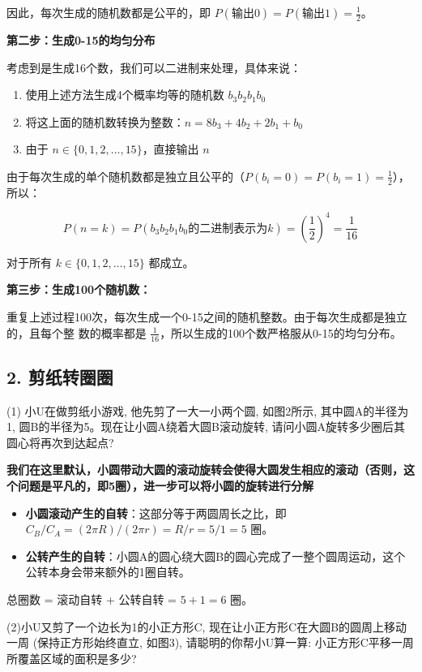 \documentclass[UTF8]{ctexart}
\begin{document}
因此，每次生成的随机数都是公平的，即 $P(\text{输出0}) = P(\text{输出1}) =
\frac{1}{2}$。

\textbf{第二步：生成0-15的均匀分布}

考虑到是生成16个数，我们可以二进制来处理，具体来说：
\begin{enumerate}
    \item 使用上述方法生成4个概率均等的随机数 $b_3b_2b_1b_0$
    \item 将这上面的随机数转换为整数：$n = 8b_3 + 4b_2 + 2b_1 + b_0$
    \item 由于 $n \in \{0,1,2,\ldots,15\}$，直接输出 $n$
\end{enumerate}


由于每次生成的单个随机数都是独立且公平的（$P(b_i = 0) = P(b_i = 1) = \frac{1}{2}$），所以：

$$P(n = k) = P(b_3b_2b_1b_0 \text{的二进制表示为} k) = \left(\frac{1}{2}\right)^4 =
\frac{1}{16}$$

对于所有 $k \in \{0,1,2,\ldots,15\}$ 都成立。

\textbf{第三步：生成100个随机数：}

重复上述过程100次，每次生成一个0-15之间的随机整数。由于每次生成都是独立的，且每个整
数的概率都是 $\frac{1}{16}$，所以生成的100个数严格服从0-15的均匀分布。

\subsection*{2. 剪纸转圈圈}

(1) 小U在做剪纸小游戏, 他先剪了一大一小两个圆, 如图2所示, 其中圆A的半径为1, 圆B的半径为5。现在让小圆A绕着大圆B滚动旋转, 请问小圆A旋转多少圈后其圆心将再次到达起点?

\textbf{我们在这里默认，小圆带动大圆的滚动旋转会使得大圆发生相应的滚动（否则，这个问题是平凡的，即5圈），进一步可以将小圆的旋转进行分解}
\begin{itemize}
    \item \textbf{小圆滚动产生的自转}：这部分等于两圆周长之比，即 $C_B / C_A = (2\pi R)/(2\pi r) = R/r = 5/1 = 5$ 圈。 
    \item \textbf{公转产生的自转}：小圆A的圆心绕大圆B的圆心完成了一整个圆周运动，这个公转本身会带来额外的1圈自转。
\end{itemize}
总圈数 = 滚动自转 + 公转自转 = $5 + 1 = 6$ 圈。

(2)小U又剪了一个边长为1的小正方形C, 现在让小正方形C在大圆B的圆周上移动一周 (保持正方形始终直立, 如图3), 请聪明的你帮小U算一算: 小正方形C平移一周所覆盖区域的面积是多少?
\end{document}
